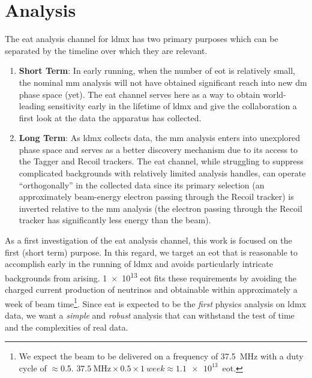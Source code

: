 \chapter{Analysis}
\label{chapter:ldmx:analysis}

The \ac{eat} analysis channel for \ac{ldmx} has two primary purposes which can
be separated by the timeline over which they are relevant.
\begin{enumerate}
	\item \textbf{Short Term}: In early running, when the number of \ac{eot} is
	      relatively small, the nominal \ac{mm} analysis will not have obtained
	      significant reach into new \ac{dm} phase space (yet). The \ac{eat} channel
	      serves here as a way to obtain world-leading sensitivity early in the lifetime
	      of \ac{ldmx} and give the collaboration a first look at the data the apparatus
	      has collected.
	\item \textbf{Long Term}: As \ac{ldmx} collects data, the \ac{mm}
	      analysis enters into unexplored phase space and serves as a better discovery
	      mechanism due to its access to the Tagger and Recoil trackers. The \ac{eat}
	      channel, while struggling to suppress complicated backgrounds with relatively
	      limited analysis handles, can operate ``orthogonally'' in the collected data
	      since its primary selection (an approximately beam-energy electron passing
	      through the Recoil tracker) is inverted relative to the \ac{mm} analysis
	      (the electron passing through the Recoil tracker has significantly less
	      energy than the beam).
\end{enumerate}
As a first investigation of the \ac{eat} analysis channel, this work is focused on
the first (short term) purpose. In this regard, we target an \ac{eot} that is reasonable
to accomplish early in the running of \ac{ldmx} and avoids particularly intricate backgrounds
from arising. \num{1e13} \ac{eot} fits these requirements by avoiding the charged current production
of neutrinos and obtainable within approximately a week of beam time\footnote{
	We expect the beam to be delivered on a frequency of \qty{37.5}{\mega\hertz} with a
	duty cycle of $\approx$\num{0.5}.
	$\qty{37.5}{\mega\hertz}\times0.5\times\qty{1}{week}\approx\num{1.1e13}$~\ac{eot}.
}.
Since \ac{eat} is expected to be the \emph{first} physics
analysis on \ac{ldmx} data, we want a \emph{simple} and \emph{robust} analysis that can withstand
the test of time and the complexities of real data.


